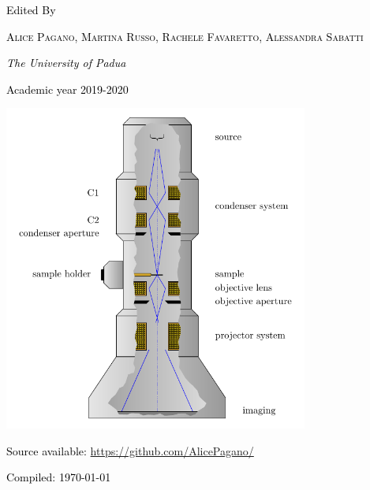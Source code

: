 \begin{titlepage}
	
	\textcolor{black}{Edited By}
	
	\vspace{0.5\baselineskip} %
	
	\textcolor{black}{\scshape\Large Alice Pagano, Martina Russo, Rachele Favaretto, Alessandra Sabatti \\} %
	
	\vspace{0.5\baselineskip} %
	
	\textcolor{black}{\textit{The University of Padua } }%
	
	\vspace{0.5\baselineskip}
	
	\textcolor{black}{\small Academic year 2019-2020}
	
	\vspace{1cm}
	
	\includegraphics[width=10cm]{../frontespizio/3.pdf}
	
	\vspace{1cm}
	
	\textcolor{black}{Source available: \url{https://github.com/AlicePagano/}
	\vspace{1cm}}
	
	\textcolor{black}{\footnotesize Compiled: \today} %
	

\end{titlepage}

\clearpage{\pagestyle{empty}\cleardoublepage}











